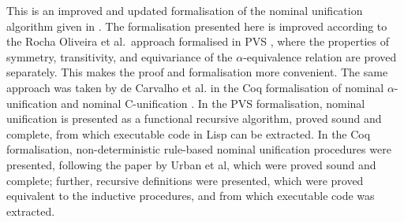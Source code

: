 \documentclass[11pt,a4paper]{article}
\begin{document}
This is an improved and updated formalisation of the nominal
unification algorithm given in
\cite{DBLP:journals/corr/abs-1012-4890,DBLP:journals/tcs/UrbanPG04}.
The formalisation presented here is improved according to the Rocha
Oliveira et al.~approach formalised in PVS
\cite{DBLP:journals/entcs/Ayala-RinconFO16,ACRochaOliveira2016}, where
the properties of symmetry, transitivity, and equivariance of the
$\alpha$-equivalence relation are proved separately. This makes the
proof and formalisation more convenient. The same approach was taken
by de Carvalho et al. in the Coq formalisation of nominal
$\alpha$-unification and nominal C-unification
\cite{DBLP:journals/tcs/Ayala-RinconSFN19,WLRdeCarvalho2019}. In the
PVS formalisation, nominal unification is presented as a functional
recursive algorithm, proved sound and complete, from which executable
code in Lisp can be extracted. In the Coq formalisation,
non-deterministic rule-based nominal unification procedures were
presented, following the paper by Urban et al, which were proved sound
and complete; further, recursive definitions were presented, which
were proved equivalent to the inductive procedures, and from which
executable code was extracted.









%
\end{document}
